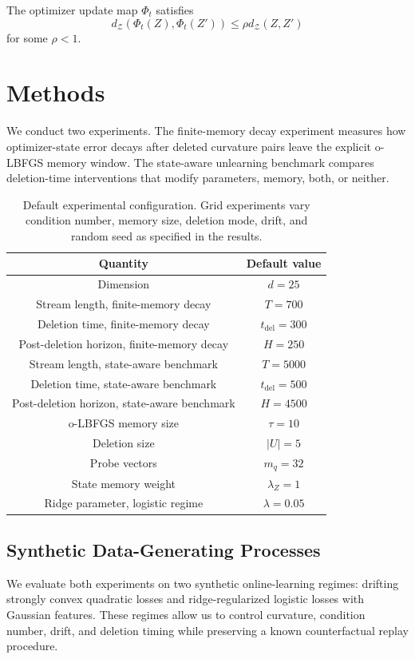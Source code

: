 \documentclass{ssl}
\begin{document}
\begin{assumption}
\label{assump: contractive-updates}
The optimizer update map $\Phi_t$ satisfies
\[
d_{\mathcal Z}(\Phi_t(Z),\Phi_t(Z'))\le \rho d_{\mathcal Z}(Z,Z')
\]
for some $\rho<1$.
\end{assumption}

\section{Methods}
We conduct two experiments. The finite-memory decay experiment measures how optimizer-state error decays after deleted curvature pairs leave the explicit o-LBFGS memory window. The state-aware unlearning benchmark compares deletion-time interventions that modify parameters, memory, both, or neither.

\begin{table}
\centering
\begin{tabular}{|c|c|}
\hline
Quantity & Default value \\
\hline
Dimension & \(d=25\) \\
Stream length, finite-memory decay & \(T=700\) \\
Deletion time, finite-memory decay & \(t_{\mathrm{del}}=300\) \\
Post-deletion horizon, finite-memory decay & \(H=250\) \\
Stream length, state-aware benchmark & \(T=5000\) \\
Deletion time, state-aware benchmark & \(t_{\mathrm{del}}=500\) \\
Post-deletion horizon, state-aware benchmark & \(H=4500\) \\
o-LBFGS memory size & \(\tau=10\) \\
Deletion size & \(|U|=5\) \\
Probe vectors & \(m_q=32\) \\
State memory weight & \(\lambda_Z=1\) \\
Ridge parameter, logistic regime & \(\lambda=0.05\) \\
\hline
\end{tabular}
\caption{Default experimental configuration. Grid experiments vary condition number, memory size, deletion mode, drift, and random seed as specified in the results.}
\label{tab:experiment-config}
\end{table}

\subsection{Synthetic Data-Generating Processes}
We evaluate both experiments on two synthetic online-learning regimes: drifting strongly convex quadratic losses and ridge-regularized logistic losses with Gaussian features. These regimes allow us to control curvature, condition number, drift, and deletion timing while preserving a known counterfactual replay procedure.
\end{document}
